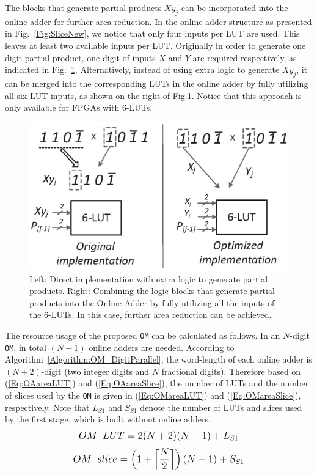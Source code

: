 \documentclass[conference]{IEEEtran}
\begin{document}
The blocks that generate partial products $Xy_j$ can be incorporated into the online adder for further area reduction. In the online adder structure as presented in Fig.~\ref{Fig:SliceNew}, we notice that only four inputs per LUT are used. This leaves at least two available inputs per LUT. Originally in order to generate one digit partial product, one digit of inputs $X$ and $Y$ are required respectively, as indicated in Fig.~\ref{Fig:PartialProduct}. Alternatively, instead of using extra logic to generate $Xy_j$, it can be merged into the corresponding LUTs in the online adder by fully utilizing all six LUT inputs, as shown on the right of Fig.\ref{Fig:PartialProduct}. Notice that this approach is only available for FPGAs with 6-LUTs.\vspace{-0.5ex}
%
\begin{figure}[tbp]
	\centering
	\includegraphics[width=.4\textwidth]{./Figures/PartialProduct.eps}
	\vspace{-2.5ex}
	\caption{Left: Direct implementation with extra logic to generate partial products. Right: Combining the logic blocks that generate partial products into the Online Adder by fully utilizing all the inputs of the 6-LUTs. In this case, further area reduction can be achieved.}
	\label{Fig:PartialProduct}
	\vspace{-1.5ex}
\end{figure}

The resource usage of the proposed \texttt{OM} can be calculated as follows. In an $N$-digit \texttt{OM}, in total $(N-1)$ online adders are needed. According to Algorithm~\ref{Algorithm:OM_DigitParallel}, the word-length of each online adder is $(N+2)$-digit (two integer digits and $N$ fractional digits). Therefore based on (\ref{Eq:OAareaLUT}) and (\ref{Eq:OAareaSlice}), the number of LUTs and the number of slices used by the \texttt{OM} is given in (\ref{Eq:OMareaLUT}) and (\ref{Eq:OMareaSlice}), respectively. Note that $L_{S1}$ and $S_{S1}$ denote the number of LUTs and slices used by the first stage, which is built without online adders.\vspace{-0.5ex}
%
\begin{eqnarray}\label{Eq:OMareaLUT}
\scriptsize
	OM\_{LUT} = 2(N+2)(N-1) + {L}_{S1}
\normalsize
\end{eqnarray}
%
\begin{eqnarray}\label{Eq:OMareaSlice}
\scriptsize
	OM\_{slice} = \left(1+\left\lceil{\frac{N}{2}}\right\rceil\right)(N-1)+S_{S1}
\normalsize
\end{eqnarray}
\end{document}
